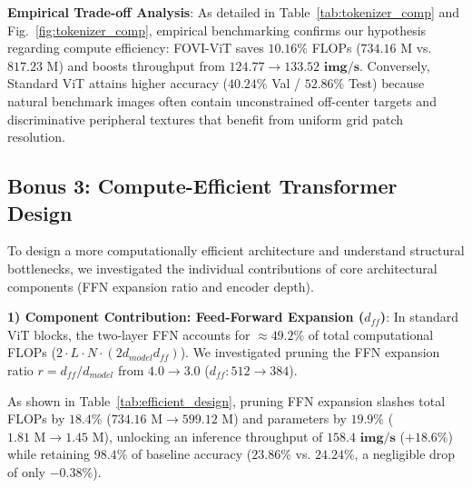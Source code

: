 \documentclass[10pt,conference]{IEEEtran}
\begin{document}
\textbf{Empirical Trade-off Analysis}:
As detailed in Table~\ref{tab:tokenizer_comp} and Fig.~\ref{fig:tokenizer_comp}, empirical benchmarking confirms our hypothesis regarding compute efficiency: FOVI-ViT saves $\mathbf{10.16\%}$ FLOPs ($734.16\text{ M}$ vs. $817.23\text{ M}$) and boosts throughput from $124.77 \to \mathbf{133.52\text{ img/s}}$. Conversely, Standard ViT attains higher accuracy ($40.24\%$ Val / $52.86\%$ Test) because natural benchmark images often contain unconstrained off-center targets and discriminative peripheral textures that benefit from uniform grid patch resolution.

\subsection{Bonus 3: Compute-Efficient Transformer Design}
To design a more computationally efficient architecture and understand structural bottlenecks, we investigated the individual contributions of core architectural components (FFN expansion ratio and encoder depth).

\textbf{1) Component Contribution: Feed-Forward Expansion ($d_{ff}$)}:
In standard ViT blocks, the two-layer FFN accounts for $\approx 49.2\%$ of total computational FLOPs ($2 \cdot L \cdot N \cdot (2 d_{model} d_{ff})$). We investigated pruning the FFN expansion ratio $r = d_{ff}/d_{model}$ from $4.0 \to 3.0$ ($d_{ff}: 512 \to 384$).

\begin{table}[h]
\centering
\caption{Compute-Efficient Transformer Design: FFN Expansion Ablation (FOVI-ViT)}
\label{tab:efficient_design}
\end{table}

As shown in Table~\ref{tab:efficient_design}, pruning FFN expansion slashes total FLOPs by $\mathbf{18.4\%}$ ($734.16\text{ M} \to 599.12\text{ M}$) and parameters by $\mathbf{19.9\%}$ ($1.81\text{ M} \to 1.45\text{ M}$), unlocking an inference throughput of $\mathbf{158.4\text{ img/s}}$ ($+18.6\%$) while retaining $\mathbf{98.4\%}$ of baseline accuracy ($23.86\%$ vs. $24.24\%$, a negligible drop of only $-0.38\%$).
\end{document}
